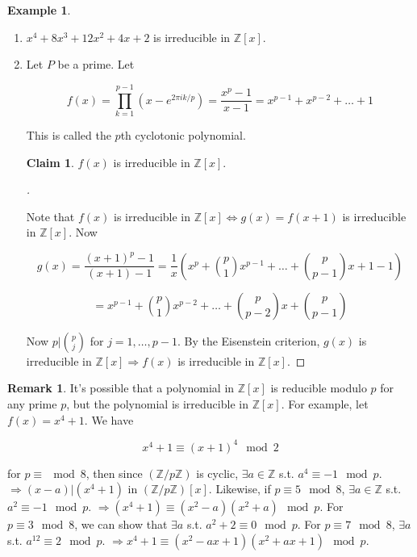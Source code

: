 \documentclass{article}
\theoremstyle{definition}
\newtheorem{ex}{Example}
\newtheorem{rem}{Remark}
\newtheorem*{clm}{Claim}
\newenvironment{proofs}[1][\proofname]{%
  \begin{proof}[#1]$ $\par\nobreak\ignorespaces
}{%
  \end{proof}
}
\begin{document}
\begin{ex}
  \begin{enumerate}
    \item $x^4 + 8x^3 + 12x^2 + 4 x + 2$ is irreducible in $\mathbb{Z}[x]$. 
    \item Let $P$ be a prime. Let 

      $$f(x) = \prod_{k = 1}^{p - 1} (x - e^{2 \pi i k/p}) = \frac{x^p - 1}{x - 1} = x^{p - 1} + x^{p - 2} + \hdots + 1$$

      This is called the $p$th cyclotonic polynomial. 

      \begin{clm}
        $f(x)$ is irreducible in $\mathbb{Z}[x]$. 
      \end{clm}
      
      \begin{proofs}
        Note that $f(x)$ is irreducible in $\mathbb{Z}[x] \Leftrightarrow g(x) = f(x + 1)$ is irreducible in $\mathbb{Z}[x]$. Now

        $$g(x) = \frac{(x+1)^p - 1}{(x+1) - 1} = \frac{1}{x} (x^p + \binom{p}{1} x^{p - 1} + \hdots + \binom{p}{p - 1}x + 1  - 1)$$

        $$ = x^{p - 1} + \binom{p}{1} x^{p - 2} + \hdots + \binom{p}{p - 2} x + \binom{p}{p - 1}$$

        Now $p|\binom{p}{j}$ for $j = 1, \hdots, p - 1$. By the Eisenstein criterion, $g(x)$ is irreducible in $\mathbb{Z}[x] \Rightarrow f(x)$ is irreducible in $\mathbb{Z}[x]$. 
      \end{proofs}
  \end{enumerate}
\end{ex}

\begin{rem}
  It's possible that a polynomial in $\mathbb{Z}[x]$ is reducible modulo $p$ for any prime $p$, but the polynomial is irreducible in $\mathbb{Z}[x]$. For example, let $f(x) = x^4 + 1$. We have 

  $$x^4 + 1 \equiv (x+1)^4 \mod 2$$

  for $p \equiv \mod 8$, then since $(\mathbb{Z}/p\mathbb{Z})$ is cyclic, $\exists a \in \mathbb{Z}$ s.t. $a^4 \equiv -1 \mod p$. $\Rightarrow (x - a) | (x^4 + 1)$ in $(\mathbb{Z}/p\mathbb{Z})[x]$. Likewise, if $p \equiv 5 \mod 8$, $\exists a \in \mathbb{Z}$ s.t. $a^2 \equiv -1 \mod p$. $\Rightarrow (x^4 + 1) \equiv (x^2 - a)(x^2 + a) \mod p$. For $p \equiv 3 \mod 8$, we can show that $\exists a$ s.t. $a^2 + 2 \equiv 0 \mod p$. For $p \equiv 7 \mod 8$, $\exists a $ s.t. $a^{12} \equiv 2 \mod p$. $\Rightarrow x^4 + 1 \equiv (x^2 - ax + 1)(x^2 + ax + 1) \mod p$.
\end{rem}
\end{document}
